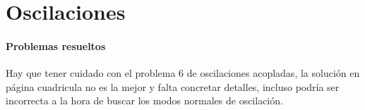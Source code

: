 \documentclass[/home/hernan/Documentos/Apuntes_mecanica_teorica/main.tex]{subfiles}
\begin{document}
    \part{Oscilaciones}

    \subsection{Problemas resueltos}
    Hay que tener cuidado con el problema 6 de oscilaciones acopladas, la solución en página cuadricula no es la mejor y falta concretar detalles, incluso podría ser incorrecta a la hora de buscar los modos normales de oscilación.
    
    
\end{document}
